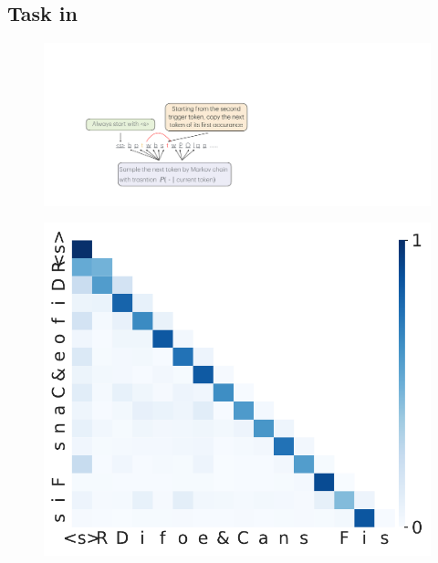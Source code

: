 \subsection{Task in \citet{bietti2024birth}}
\begin{figure}[t]
  \centering
  \begin{minipage}{0.4\textwidth}
      \centering
      \label{fig:appendix-pretraining-dgp}
      \vspace{-.2em}
      \includegraphics[width=\linewidth]{Figures/figures_pretraining/Biette.pdf}
  \end{minipage}
  \hspace{-1em}
  \begin{minipage}{0.3\textwidth}
      \centering
      \label{fig:appendix-biette-attn-weights-dormant-l0}
      \vspace{-.2em}
      \includegraphics[width=\linewidth]{Figures/figures_pretraining/Biette_attn_weights_seq0_layer0.pdf}

\end{minipage}
\end{figure}
